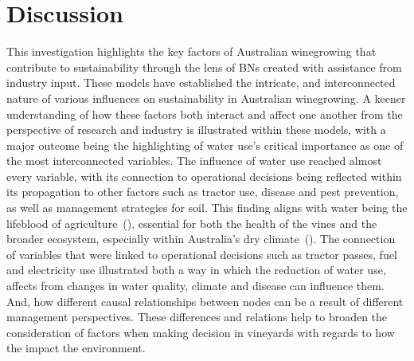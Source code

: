 \documentclass[10pt,letterpaper]{article}
\begin{document}




\section*{Discussion}
This investigation highlights the key factors of Australian winegrowing that contribute to sustainability through the lens of BNs created with assistance from industry input. These models have established the intricate, and interconnected nature of various influences on sustainability in Australian winegrowing. A keener understanding of how these factors both interact and affect one another from the perspective of research and industry is illustrated within these models, with a major outcome being the highlighting of water use's critical importance as one of the most interconnected variables. The influence of water use reached almost every variable, with its connection to operational decisions being reflected within its propagation to other factors such as tractor use, disease and pest prevention, as well as management strategies for soil. This finding aligns with water being the lifeblood of agriculture~(\cite{chawlaWaterProductivityAgriculture2023}), essential for both the health of the vines and the broader ecosystem, especially within Australia's dry climate~(\cite{australianbureauofstatisticsWaterUseAustralian2021}). The connection of variables that were linked to operational decisions such as tractor passes, fuel and electricity use illustrated both a way in which the reduction of water use, affects from changes in water quality, climate and disease can influence them. And, how different causal relationships between nodes can be a result of different management perspectives. These differences and relations help to broaden the consideration of factors when making decision in vineyards with regards to how the impact the environment.
\end{document}
